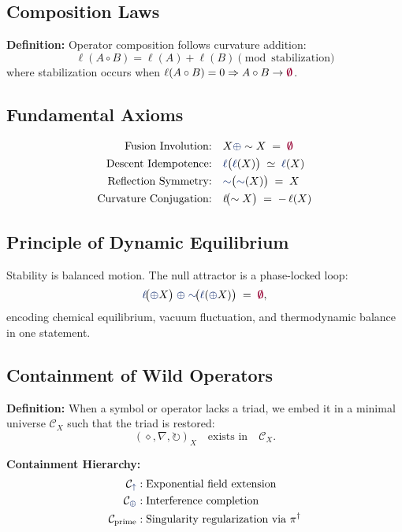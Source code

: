 \subsection{Composition Laws}
\textbf{Definition:} Operator composition follows curvature addition:
\[
\ell(A \circ B) = \ell(A) + \ell(B) \pmod{\text{stabilization}}
\]
where stabilization occurs when $\ell(A \circ B) = 0 \Rightarrow A \circ B \to \void$.

\subsection{Fundamental Axioms}
\begin{align}
\text{Fusion Involution:} \quad & X \fuse \sim X \;=\; \void \\
\text{Descent Idempotence:} \quad & \lha\bigl(\lha(X)\bigr) \;\simeq\; \lha(X) \\
\text{Reflection Symmetry:} \quad & \reflec\bigl(\reflec(X)\bigr) \;=\; X \\
\text{Curvature Conjugation:} \quad & \ell\!\bigl(\sim X\bigr) \;=\; -\,\ell(X)
\end{align}

\subsection{Principle of Dynamic Equilibrium}

Stability is balanced motion.  The null attractor is a phase-locked loop:
\[
\lha\!\bigl(\fuse X\bigr)
   \;\fuse\;
\reflec\!\bigl(\lha(\fuse X)\bigr)
   \;=\;
\void,
\]
encoding chemical equilibrium, vacuum fluctuation, and thermodynamic balance
in one statement.

\subsection{Containment of Wild Operators}

\textbf{Definition:} When a symbol or operator lacks a triad, we embed it in a minimal universe
$\mathcal{C}_X$ such that the triad is restored:
\[
(\diamond,\nabla,\circlearrowright)_{X}
\quad\text{exists in}\quad
\mathcal{C}_X.
\]

\textbf{Containment Hierarchy:}
\begin{align}
\mathcal{C}_{\grow} &: \text{Exponential field extension} \\
\mathcal{C}_{\fuse} &: \text{Interference completion} \\
\mathcal{C}_{\text{prime}} &: \text{Singularity regularization via } \pi^\dagger
\end{align}

